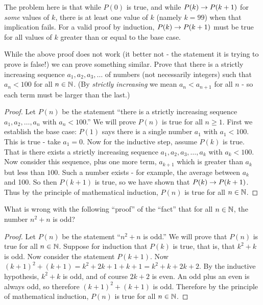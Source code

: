 \begin{questions}
 	\begin{answer}
 		The problem here is that while $P(0)$ is true, and while $P(k) \rightarrow P(k+1)$ for {\em some} values of $k$, there is at least one value of $k$ (namely $k = 99$) when that implication fails.  For a valid proof by induction, $P(k) \rightarrow P(k+1)$ must be true for all values of $k$ greater than or equal to the base case.
 	\end{answer}
 	
 	
 	
 

\question While the above proof does not work (it better not - the statement it is trying to prove is false!)  we can prove something similar.  Prove that there is a strictly increasing sequence $a_1, a_2, a_3, \ldots$ of numbers (not necessarily integers) such that $a_n < 100$ for all $n \in \mathbb N$.  (By {\em strictly increasing} we mean $a_n < a_{n+1}$ for all $n$ - so each term must be larger than the last.)

	\begin{answer}
		\begin{proof}
		 Let $P(n)$ be the statement ``there is a strictly increasing sequence $a_1, a_2, \ldots, a_n$ with $a_n < 100$.''  We will prove $P(n)$ is true for all $n \ge 1$. First we establish the base case: $P(1)$ says there is a single number $a_1$ with $a_1 < 100$.  This is true - take $a_1 = 0$.  Now for the inductive step, assume $P(k)$ is true.  That is there exists a strictly increasing sequence $a_1, a_2, a_3, \ldots, a_k$ with $a_k < 100$.  Now consider this sequence, plus one more term, $a_{k+1}$ which is greater than $a_k$ but less than $100$.  Such a number exists - for example, the average between $a_k$ and 100.  So then $P(k+1)$ is true, so we have shown that $P(k) \rightarrow P(k+1)$.  Thus by the principle of mathematical induction, $P(n)$ is true for all $n \in \mathbb N$.
		\end{proof}
		
	\end{answer}
	
	
	



\question What is wrong with the following ``proof'' of the ``fact'' that for all $n \in \mathbb N$, the number $n^2 + n$ is odd?
  \begin{proof}
    Let $P(n)$ be the statement ``$n^2 + n$ is odd.''  We will prove that $P(n)$ is true for all $n \in \mathbb N$.  Suppose for induction that $P(k)$ is true, that is, that $k^2 + k$ is odd.  Now consider the statement $P(k+1)$.  Now $(k+1)^2 + (k+1) = k^2 + 2k + 1 + k + 1 = k^2 + k + 2k + 2$.  By the inductive hypothesis, $k^2 + k$ is odd, and of course $2k + 2$ is even.  An odd plus an even is always odd, so therefore $(k+1)^2 + (k+1)$ is odd.  Therefore by the principle of mathematical induction, $P(n)$ is true for all $n \in \mathbb N$.
  \end{proof}
  

\end{questions}
